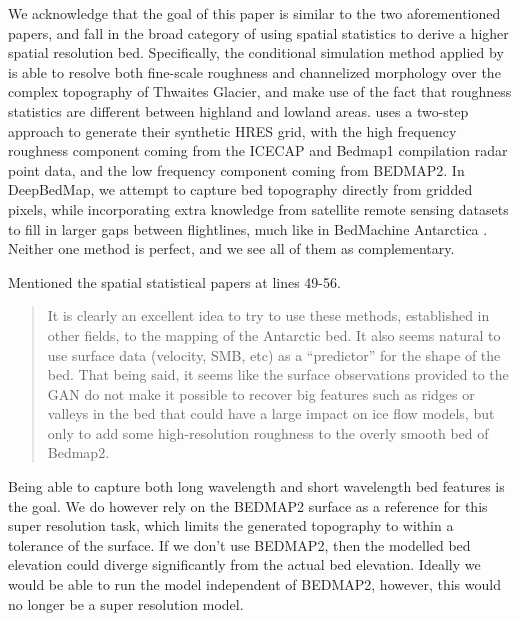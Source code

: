 \documentclass{article}
\begin{document}
We acknowledge that the goal of this paper is similar to the two aforementioned papers, and fall in the broad category of using spatial statistics to derive a higher spatial resolution bed.
Specifically, the conditional simulation method applied by \citet{GoffConditionalsimulationThwaites2014} is able to resolve both fine-scale roughness and channelized morphology over the complex topography of Thwaites Glacier, and make use of the fact that roughness statistics are different between highland and lowland areas.
\citet{Grahamhighresolutionsyntheticbed2017} uses a two-step approach to generate their synthetic HRES grid, with the high frequency roughness component coming from the ICECAP and Bedmap1 compilation radar point data, and the low frequency component coming from BEDMAP2.
In DeepBedMap, we attempt to capture bed topography directly from gridded pixels,  while incorporating extra knowledge from satellite remote sensing datasets to fill in larger gaps between flightlines, much like in BedMachine Antarctica \citep{MorlighemDeepglacialtroughs2019}.
Neither one method is perfect, and we see all of them as complementary.

{
  \color{ForestGreen}
  Mentioned the spatial statistical papers at lines 49-56.
}


\begin{quote}
\color{blue}
  It is clearly an excellent idea to try to use these methods, established in other fields, to the mapping of the Antarctic bed.
  It also seems natural to use surface data (velocity, SMB, etc) as a “predictor” for the shape of the bed.
  That being said, it seems like the surface observations provided to the GAN do not make it possible to recover big features such as ridges or valleys in the bed that could have a large impact on ice flow models, but only to add some high-resolution roughness to the overly smooth bed of Bedmap2.
\end{quote}

Being able to capture both long wavelength and short wavelength bed features is the goal.
We do however rely on the BEDMAP2 surface as a reference for this super resolution task, which limits the generated topography to within a tolerance of the surface.
If we don't use BEDMAP2, then the modelled bed elevation could diverge significantly from the actual bed elevation.
Ideally we would be able to run the model independent of BEDMAP2, however, this would no longer be a super resolution model.
\end{document}
